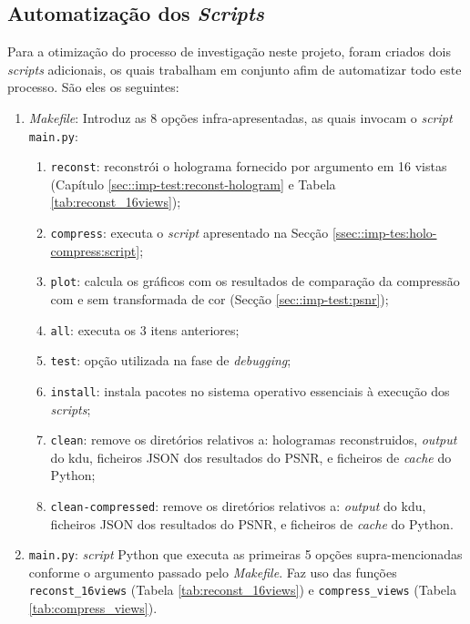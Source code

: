 \subsection{Automatização dos \textit{Scripts}}
\label{ssec::imp-test:holo-compress:auto-script}

Para a otimização do processo de investigação neste projeto, foram criados dois \textit{scripts} adicionais, os quais trabalham em conjunto afim de automatizar todo este processo. São eles os seguintes:
\begin{enumerate}
    \item \textit{Makefile}: Introduz as 8 opções infra-apresentadas, as quais invocam o \textit{script} \verb|main.py|: 
        \begin{enumerate}
            \item \verb|reconst|: reconstrói o holograma fornecido por argumento em 16 vistas (Capítulo \ref{sec::imp-test:reconst-hologram} e Tabela \ref{tab:reconst_16views});
            \item \verb|compress|: executa o \textit{script} apresentado na Secção \ref{ssec::imp-tes:holo-compress:script};
            \item \verb|plot|: calcula os gráficos com os resultados de comparação da   compressão com e sem transformada de cor (Secção \ref{sec::imp-test:psnr});
            \item \verb|all|: executa os 3 itens anteriores;
            \item \verb|test|: opção utilizada na fase de \textit{debugging};
            \item \verb|install|: instala pacotes no sistema operativo essenciais à execução dos \textit{scripts};
            \item \verb|clean|: remove os diretórios relativos a: hologramas reconstruidos, \textit{output} do \ac{kdu}, ficheiros JSON dos resultados do \ac{PSNR}, e ficheiros de \textit{cache} do Python;
            \item \verb|clean-compressed|: remove os diretórios relativos a: \textit{output} do \ac{kdu}, ficheiros JSON dos resultados do \ac{PSNR}, e ficheiros de \textit{cache} do Python.
        \end{enumerate}
    \item \verb|main.py|: \textit{script} Python que executa as primeiras 5 opções supra-mencionadas conforme o argumento passado pelo \textit{Makefile}. Faz uso das funções \verb|reconst_16views| (Tabela \ref{tab:reconst_16views}) e \verb|compress_views| (Tabela \ref{tab:compress_views}).
\end{enumerate}



